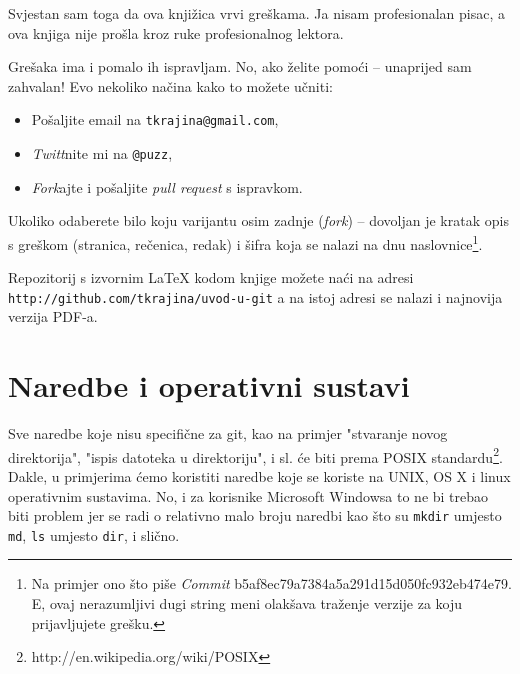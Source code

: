 Svjestan sam toga da ova knjižica vrvi greškama.
Ja nisam profesionalan pisac, a ova knjiga nije prošla kroz ruke profesionalnog lektora.

Grešaka ima i pomalo ih ispravljam.
No, ako želite pomoći -- unaprijed sam zahvalan!
Evo nekoliko načina kako to možete učniti:

\begin{itemize}
    \item Pošaljite email na \verb+tkrajina@gmail.com+,
    \item \emph{Twitt}nite mi na \verb+@puzz+,
    \item \emph{Fork}ajte i pošaljite \emph{pull request} s ispravkom. 
\end{itemize}

Ukoliko odaberete bilo koju varijantu osim zadnje (\emph{fork}) -- dovoljan je kratak opis s greškom (stranica, rečenica, redak) i šifra koja se nalazi na dnu naslovnice\footnote{Na primjer ono što piše \emph{Commit} b5af8ec79a7384a5a291d15d050fc932eb474e79. E, ovaj nerazumljivi dugi string meni olakšava traženje verzije za koju prijavljujete grešku.}.

Repozitorij s izvornim \LaTeX{} kodom knjige možete naći na adresi \\\verb+http://github.com/tkrajina/uvod-u-git+
 a na istoj adresi se nalazi i najnovija verzija PDF-a.

\section*{Naredbe i operativni sustavi}

Sve naredbe koje nisu specifične za git, kao na primjer "stvaranje novog direktorija", "ispis datoteka u direktoriju", i sl. će biti prema POSIX standardu\footnote{http://en.wikipedia.org/wiki/POSIX}.
Dakle, u primjerima ćemo koristiti naredbe koje se koriste na UNIX, OS X i linux operativnim sustavima. 
No, i za korisnike Microsoft Windowsa to ne bi trebao biti problem jer se radi o relativno malo broju naredbi kao što su \verb+mkdir+ umjesto \verb+md+, \verb+ls+ umjesto \verb+dir+, i slično.
